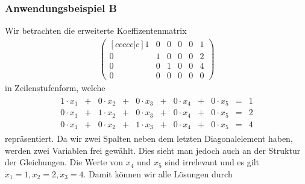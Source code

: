 \subsubsection*{Anwendungsbeispiel B}
Wir betrachten die erweiterte Koeffizentenmatrix
\begin{align*}
\begin{pmatrix}[ccccc|c]
1 & 0 & 0 & 0 & 0 & 1\\
0 & 1 & 0 & 0 & 0 & 2\\
0 & 0 & 1 & 0 & 0 & 4\\
0 & 0 & 0 & 0 & 0 & 0
\end{pmatrix}
\end{align*}
in Zeilenstufenform, welche
\begin{align*}
\begin{matrix}
1 \cdot x_1 & +& 0 \cdot x_2 & + & 0 \cdot x_3 & + & 0 \cdot x_4 & + & 0 \cdot x_5 & = & 1\\
0 \cdot x_1 & +&  1 \cdot x_2 & + & 0 \cdot x_3 & + & 0 \cdot x_4 & + & 0 \cdot x_5 & = & 2\\
0 \cdot x_1 & +& 0 \cdot x_2 & + & 1 \cdot x_3 & + & 0 \cdot x_4 & + & 0 \cdot x_5 & = & 4
\end{matrix}
\end{align*}
repräsentiert.
Da wir zwei Spalten neben dem letzten Diagonalelement haben, werden zwei Variablen frei gewählt.
Dies sieht man jedoch auch an der Struktur der Gleichungen.
Die Werte von $x_4$ und $x_5$ sind irrelevant und es gilt $x_1 = 1, x_2 = 2, x_3 = 4$.
Damit können wir alle Lösungen durch
